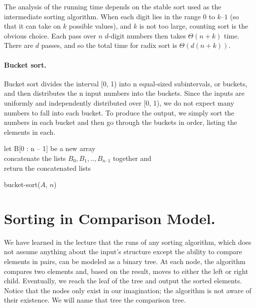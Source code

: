 The analysis of the running time depends on the stable sort used as the intermediate sorting algorithm. When each digit lies in the range $0$ to $k – 1$ (so that it can take on $k$ possible values), and $k$ is not too large, counting sort is the obvious choice. Each pass over $n$ $d$-digit numbers then takes $\Theta(n + k)$ time. There are $d$ passes, and so the total time for radix sort is $\Theta\left(d(n + k)\right)$.

\paragraph{Bucket sort.  }
Bucket sort divides the interval [0, 1) into n equal-sized subintervals, or buckets, and then distributes the n input numbers into the buckets. Since the inputs are uniformly and independently distributed over [0, 1), we do not expect many numbers to fall into each bucket. To produce the output, we simply sort the numbers in each bucket and then go through the buckets in order, listing the elements in each.

%
  \begin{algorithm}
    	let B[0 : n – 1] be a new array \\
	\For{ $i \leftarrow [1, n]$}{
	    insert $A_{i}$ into list $B_{ \lfloor n A_{i} \rfloor} ]$
       	}
	concatenate the lists $B_{0}, B_{1}, .. , B_{n – 1}$ together and\\
	return the concatenated lists
\caption{bucket-sort($A$, $n$)}
  \end{algorithm}
%

%

\section{Sorting in Comparison Model.}

We have learned in the lecture that the runs of any sorting algorithm, which does not assume anything about the input's structure except the ability to compare elements in pairs, can be modeled as a binary tree. At each node, the algorithm compares two elements and, based on the result, moves to either the left or right child. Eventually, we reach the leaf of the tree and output the sorted elements. Notice that the nodes only exist in our imagination; the algorithm is not aware of their existence. We will name that tree the comparison tree.


